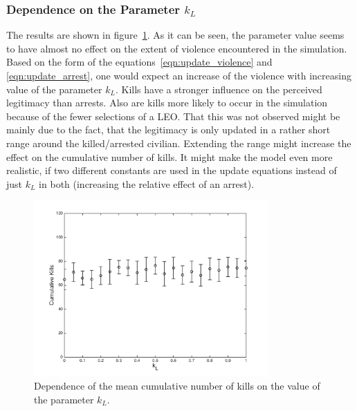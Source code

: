 \documentclass[11pt]{article}
\begin{document}
\subsubsection{Dependence on the Parameter $k_L$}
The results are shown in figure~\ref{fig:k_L_dep}. As it can be seen, the parameter value seems to have almost no effect on the extent of violence encountered in the simulation. Based on the form of the equations~\eqref{eqn:update_violence} and \eqref{eqn:update_arrest}, one would expect an increase of the violence with increasing value of the parameter $k_L$. Kills have a stronger influence on the perceived legitimacy than arrests. Also are kills more likely to occur in the simulation because of the fewer selections of a LEO. That this was not observed might be mainly due to the fact, that the legitimacy is only updated in a rather short range around the killed/arrested civilian. Extending the range might increase the effect on the cumulative number of kills. It might make the model even more realistic, if two different constants are used in the update equations instead of just $k_L$ in both (increasing the relative effect of an arrest).
\begin{figure}[!htbp]
	\centering
		\includegraphics[width=0.80\textwidth]{../../code/modified_model/k_L_dep.png}
	\caption{Dependence of the mean cumulative number of kills on the value of the parameter $k_L$.}
	\label{fig:k_L_dep}
\end{figure}
\end{document}
